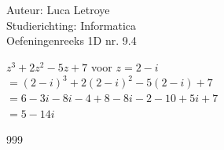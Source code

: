 \documentclass[a4paper]{article}
\begin{document}
  
\noindent \large Auteur: Luca Letroye        \\
\noindent \large Studierichting: Informatica \\
\noindent \large Oefeningenreeks 1D nr. 9.4 \\

\medskip

\normalsize

$z^3+2z^2 -5z +7 $ voor $ z = 2-i$\\

$ = (2-i)^3+2(2-i)^2-5(2-i) +7$\\

$ = 6-3i -8i-4+8-8i-2-10+5i+7$\\

$ = 5-14i$\\




\begin{thebibliography}{999}
\end{thebibliography}
\end{document}
